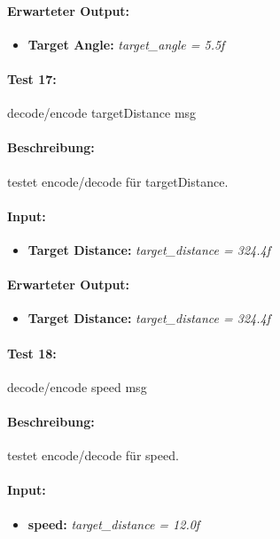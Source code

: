 \documentclass[a4paper, 12pt, titlepage]{scrartcl}
\begin{document}
{			\paragraph{Erwarteter Output:}
			\begin{itemize} \itemsep-0.5em
				\item \textbf{Target Angle:} \emph{target\_angle = 5.5f}
			\end{itemize}
			
			\paragraph{Test 17:}{decode/encode targetDistance msg}
			\paragraph{Beschreibung:} testet encode/decode für targetDistance.
			\paragraph{Input:}
			\begin{itemize} \itemsep-0.5em
				\item \textbf{Target Distance:} \emph{target\_distance = 324.4f}
			\end{itemize}
			\paragraph{Erwarteter Output:}
			\begin{itemize} \itemsep-0.5em
				\item \textbf{Target Distance:} \emph{target\_distance = 324.4f}
			\end{itemize}
			
			\paragraph{Test 18:}{decode/encode speed msg}
			\paragraph{Beschreibung:} testet encode/decode für speed.
			\paragraph{Input:}
			\begin{itemize} \itemsep-0.5em
				\item \textbf{speed:} \emph{target\_distance = 12.0f}
			\end{itemize}
}
\end{document}
